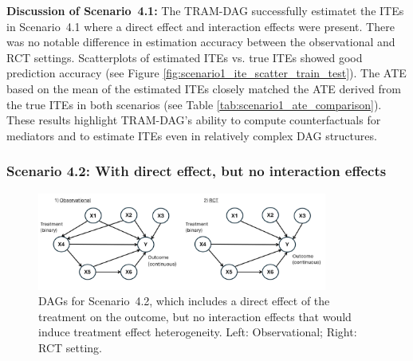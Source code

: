 \FloatBarrier


\textbf{Discussion of Scenario~4.1:} The TRAM-DAG successfully estimatet the ITEs in Scenario~4.1 where a direct effect and interaction effects were present. There was no notable difference in estimation accuracy between the observational and RCT settings. Scatterplots of estimated ITEs vs. true ITEs showed good prediction accuracy (see Figure \ref{fig:scenario1_ite_scatter_train_test}). The ATE based on the mean of the estimated ITEs closely matched the ATE derived from the true ITEs in both scenarios (see Table \ref{tab:scenario1_ate_comparison}). These results highlight TRAM-DAG's ability to compute counterfactuals for mediators and to estimate ITEs even in relatively complex DAG structures.


\clearpage


\subsubsection{Scenario 4.2: With direct effect, but no interaction effects} \label{sec:exp4_sc2}

\begin{figure}[H]
\centering
\includegraphics[width=0.85\textwidth]{img/exp4_dag_2.png}
\caption{DAGs for Scenario~4.2, which includes a direct effect of the treatment on the outcome, but no interaction effects that would induce treatment effect heterogeneity. Left: Observational; Right: RCT setting.}
\label{fig:ite_dag_observational_2}
\end{figure}

